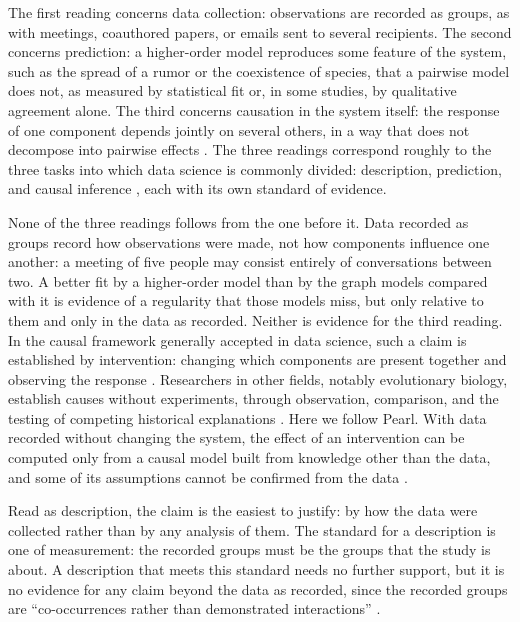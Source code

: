 \documentclass[utf8]{FrontiersinHarvard}
\begin{document}
The first reading concerns data collection: observations are recorded as groups, as with meetings, coauthored papers, or emails sent to several recipients. The second concerns prediction: a higher-order model reproduces some feature of the system, such as the spread of a rumor or the coexistence of species, that a pairwise model does not, as measured by statistical fit or, in some studies, by qualitative agreement alone. The third concerns causation in the system itself: the response of one component depends jointly on several others, in a way that does not decompose into pairwise effects \citep{perezreche2026}. The three readings correspond roughly to the three tasks into which data science is commonly divided: description, prediction, and causal inference \citep{hernan2019}, each with its own standard of evidence.

None of the three readings follows from the one before it. Data recorded as groups record how observations were made, not how components influence one another: a meeting of five people may consist entirely of conversations between two. A better fit by a higher-order model than by the graph models compared with it is evidence of a regularity that those models miss, but only relative to them \citep{sober2004} and only in the data as recorded. Neither is evidence for the third reading. In the causal framework generally accepted in data science, such a claim is established by intervention: changing which components are present together and observing the response \citep[p.~417]{pearl2009causality}. Researchers in other fields, notably evolutionary biology, establish causes without experiments, through observation, comparison, and the testing of competing historical explanations \citep{mayr2000}. Here we follow Pearl. With data recorded without changing the system, the effect of an intervention can be computed only from a causal model built from knowledge other than the data, and some of its assumptions cannot be confirmed from the data \citep{pearl2009overview,manski1991,shalizi2011}.

Read as description, the claim is the easiest to justify: by how the data were collected rather than by any analysis of them. The standard for a description is one of measurement: the recorded groups must be the groups that the study is about. A description that meets this standard needs no further support, but it is no evidence for any claim beyond the data as recorded, since the recorded groups are ``co-occurrences rather than demonstrated interactions'' \citep{perezreche2026}.
\end{document}
